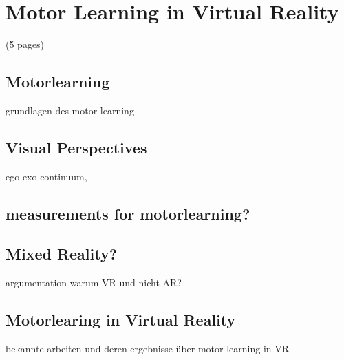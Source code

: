 \chapter{Motor Learning in Virtual Reality}
(5 pages)
\section{Motorlearning}
grundlagen des motor learning
\section{Visual Perspectives}
ego-exo continuum,
\section{measurements for motorlearning?}
\section{Mixed Reality?}
argumentation warum VR und nicht AR?
\section{Motorlearing in Virtual Reality}
bekannte arbeiten und deren ergebnisse über motor learning in VR\\
